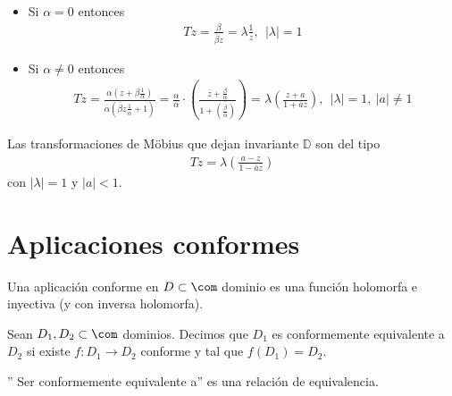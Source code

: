 \begin{obs}
\begin{itemize}
    \item Si $\alpha = 0$ entonces
    \begin{align*}
        Tz = \frac{\beta}{ \overline{\beta}z} = \lambda \frac{1}{z}, \ \ |\lambda| = 1
    \end{align*}
    \item Si $\alpha \not = 0$ entonces
    \begin{align*}
        Tz = \frac{\alpha\left(z +\beta \frac{1}{\alpha}\right)}{ \overline{\alpha}\left(\overline{\beta}z \frac{1}{\overline{\alpha}} + 1\right)} = \frac{\alpha}{\overline{\alpha}} \cdot \left( \frac{\overline{z} + \frac{\beta}{\alpha}}{1 + \overline{\left(\frac{\beta}{\alpha}\right)}} \right) = \lambda\left( \frac{z + a}{1 + \overline{a}z}\right) , \ \ |\lambda| = 1, \ |a| \not =  1
    \end{align*}
\end{itemize}
\end{obs}

\begin{teo}
Las transformaciones de M\"obius que dejan invariante $\mathbb{D}$ son del tipo
\begin{align*}
    Tz = \lambda\left( \frac{a-z}{1 - \overline{a}z}\right)
\end{align*}
con $|\lambda| = 1$ y $|a| < 1$.
\end{teo}

\section{Aplicaciones conformes}

\begin{defi}
Una aplicación conforme en $D \subset \com$ dominio es una función holomorfa e inyectiva (y con inversa holomorfa).
\end{defi}

\begin{defi}
Sean $D_1,D_2 \subset \com$ dominios. Decimos que $D_1$ es conformemente equivalente a $D_2$ si existe $f: D_1 \longrightarrow D_2$ conforme y tal que $f(D_1) = D_2$.
\end{defi}

\begin{prop}''
Ser conformemente equivalente a'' es una relación de equivalencia.
\end{prop}


